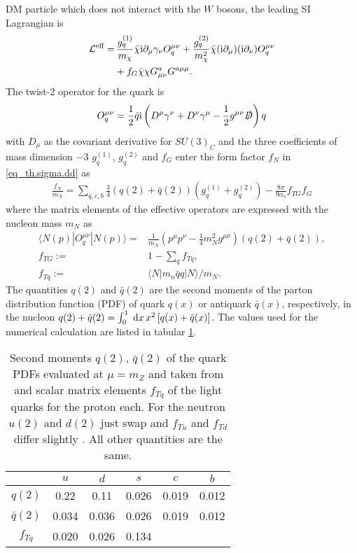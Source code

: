 DM particle which does not interact with the $W$ bosons, the leading SI Lagrangian is
\begin{align}
 \mathcal{L}^\text{eff} =&\, \frac{g_q^{(1)}}{m_\chi} \bar \chi\text{i} \partial_\mu \gamma_\nu O_q^{\mu\nu} + \frac{g_q^{(2)}}{m^2_\chi} \bar \chi(\text{i} \partial_\mu) (\text{i}\partial_\nu) O_q^{\mu\nu} \\
 \nonumber
 &+ f_G \bar \chi \chi G^a_{\mu\nu} G^{a\mu\mu}.
\end{align}
The twist-2 operator for the quark is
\begin{align}
 O_q^{\mu\nu} = \frac12 \bar q \text{i} \left(D^\mu \gamma^\nu + D^\nu \gamma^\mu - \frac12 g^{\mu\nu} \slashed{D}\right) q
\end{align}
with $D_\mu$ as the covariant derivative for $SU(3)_C$ and the three coefficients of mass dimension $-3$ $g_q^{(1)}$, $g_q^{(2)}$ and $f_G$ enter 
the form factor $f_N$ in \eqref{eq_th.sigma.dd} as
\begin{align}
 \frac{f_N}{m_N} = \sum\limits_{q,c,b} \frac34 \left(q(2)+\bar q(2)\right) \left(g_q^{(1)} + g_q^{(2)}\right) - \frac{8\pi}{9\alpha_s}f_{TG}f_G
 \label{eq_ddformfactorA}
\end{align}
where the matrix elements of the effective operators are expressed with the nucleon mass $m_N$ as \cite{1007.2601}
\begin{subequations}
\begin{align}
 \langle N(p)| O_q^{\mu\nu} | N(p)\rangle =& \frac{1}{m_N}\left(p^\mu p^\nu - \frac14 m_N^2 g^{\mu\nu}\right) \left(q(2) + \bar q(2)\right),\\
 f_{TG} :=& 1- \sum\limits_q f_{Tq},\\
 f_{Tq} :=& \langle N|m_n \bar qq |N\rangle /m_N.
\end{align}
\end{subequations}
The quantities $q(2)$ and $\bar q(2)$ are the second moments \cite{0811.1779} of the parton distribution function (PDF) of quark $q(x)$ or antiquark 
$\bar q(x)$, respectively, in the nucleon $q(2)+\bar q(2) = \int_0^1 \; \mathrm{d} x\, x^2 \left[q(x) + \bar q(x)\right]$. The values used for the numerical
calculation are listed in tabular \ref{tab_parton}.
\begin{table}[b]
 \begin{tabular}{c|ccccc}
   & $u$ & $d$ & $s$ & $c$ &$b$ \\
   \hline
  $q(2)$ & 0.22 & 0.11 & 0.026 & 0.019 & 0.012\\
  $\bar q(2)$ & 0.034 & 0.036 & 0.026 & 0.019 & 0.012\\
  $f_{Tq}$ & 0.020& 0.026 & 0.134 \cite{1209.3641}\\
 \end{tabular}
\caption{Second moments $q(2)$, $\bar q(2)$ of the quark PDFs evaluated at $\mu=m_Z$ and taken from \cite{0201195} and scalar matrix elements $f_{Tq}$ of 
the light quarks for the 
proton each. For the neutron $u(2)$ and $d(2)$ just swap and $f_{Tu}$ and $f_{Td}$ differ slightly \cite{9506380}. All other quantities are the same. }
\label{tab_parton}
\end{table}
